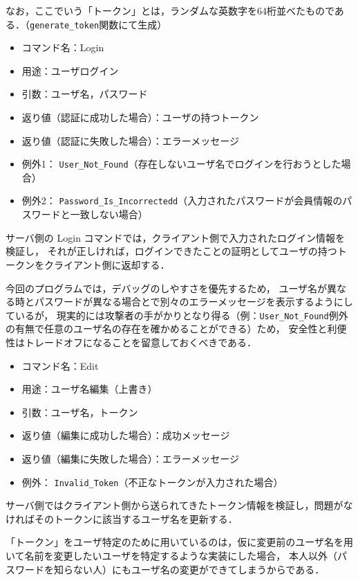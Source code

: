 \documentclass[11pt]{jsarticle}
\begin{document}
なお，ここでいう「トークン」とは，ランダムな英数字を64桁並べたものである．（{\tt generate\_token}関数にて生成）

\begin{itemize}
  \item コマンド名：Login
  \item 用途：ユーザログイン
  \item 引数：ユーザ名，パスワード
  \item 返り値（認証に成功した場合）：ユーザの持つトークン
  \item 返り値（認証に失敗した場合）：エラーメッセージ
  \item 例外1： {\tt User\_Not\_Found}（存在しないユーザ名でログインを行おうとした場合）
  \item 例外2： {\tt Password\_Is\_Incorrectedd}（入力されたパスワードが会員情報のパスワードと一致しない場合）
\end{itemize}

サーバ側の Login コマンドでは，クライアント側で入力されたログイン情報を検証し，
それが正しければ，ログインできたことの証明としてユーザの持つトークンをクライアント側に返却する．

今回のプログラムでは，デバッグのしやすさを優先するため，
ユーザ名が異なる時とパスワードが異なる場合とで別々のエラーメッセージを表示するようにしているが，
現実的には攻撃者の手がかりとなり得る（例：{\tt User\_Not\_Found}例外の有無で任意のユーザ名の存在を確かめることができる）ため，
安全性と利便性はトレードオフになることを留意しておくべきである．

\begin{itemize}
  \item コマンド名：Edit
  \item 用途：ユーザ名編集（上書き）
  \item 引数：ユーザ名，トークン
  \item 返り値（編集に成功した場合）：成功メッセージ
  \item 返り値（編集に失敗した場合）：エラーメッセージ
  \item 例外： {\tt Invalid\_Token}（不正なトークンが入力された場合）
\end{itemize}

サーバ側ではクライアント側から送られてきたトークン情報を検証し，問題がなければそのトークンに該当するユーザ名を更新する．

「トークン」をユーザ特定のために用いているのは，仮に変更前のユーザ名を用いて名前を変更したいユーザを特定するような実装にした場合，
本人以外（パスワードを知らない人）にもユーザ名の変更ができてしまうからである．
\end{document}

